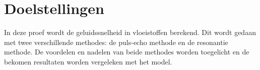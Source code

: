 \section{Doelstellingen}

In deze proef wordt de geluidssnelheid in vloeistoffen berekend. Dit wordt 
gedaan met twee verschillende methodes: de puls-echo methode en de resonantie 
methode. De voordelen en nadelen van beide methodes worden toegelicht en de 
bekomen resultaten worden vergeleken met het model.
